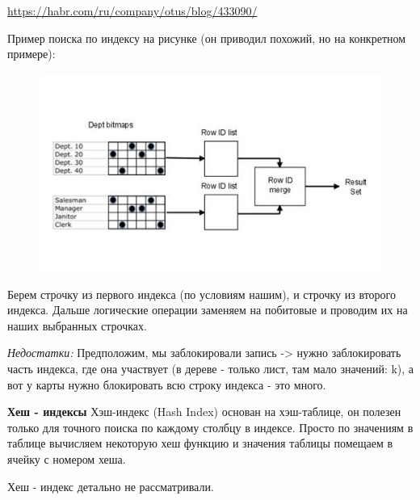 \url{https://habr.com/ru/company/otus/blog/433090/}

Пример поиска по индексу на рисунке (он приводил похожий, но на конкретном примере): 
\begin{figure}[H]
	\centering
	\includegraphics[scale = 0.3]{4/Map.jpeg}
\end{figure}

Берем строчку из первого индекса (по условиям нашим), и строчку из второго индекса. Дальше логические операции заменяем на побитовые и проводим их на наших выбранных строчках. 

\textit{Недостатки:} Предположим, мы заблокировали запись -> нужно заблокировать часть индекса, где она участвует (в дереве - только лист, там мало значений: k), а вот у карты нужно блокировать всю строку индекса - это много.

\textbf{Хеш - индексы} 
Хэш-индекс (Hash Index) основан на хэш-таблице, он полезен только для точного поиска по каждому столбцу в индексе. Просто по значениям в таблице вычисляем некоторую хеш функцию и значения таблицы помещаем в ячейку с номером хеша. 

Хеш - индекс детально не рассматривали. 
